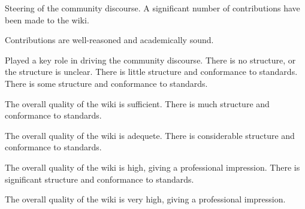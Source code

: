 \documentclass{../../fal_assignment}
\begin{document}
\begin{markingrubric}
        \par		Steering of the community discourse.
        \grade 		A significant number of contributions have been made to the wiki.
        \par		Contributions are well-reasoned and academically sound.
        \par		Played a key role in driving the community discourse.
%
        \grade\fail 	There is no structure, or the structure is unclear.
        \grade 		There is little structure and conformance to standards.
        \grade 		There is some structure and conformance to standards.
        \par 		The overall quality of the wiki is sufficient.
        \grade 		There is much structure and conformance to standards.
        \par 		The overall quality of the wiki is adequete.
        \grade 		There is considerable structure and conformance to standards.
        \par 		The overall quality of the wiki is high, giving a professional impression.
        \grade 		There is significant structure and conformance to standards.
        \par 		The overall quality of the wiki is very high, giving a professional impression.
\end{markingrubric}
\end{document}
